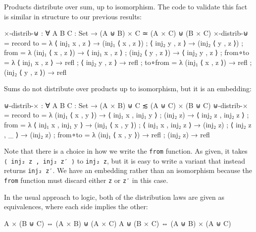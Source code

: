 Products distribute over sum, up to isomorphism. The code to validate
this fact is similar in structure to our previous results:

\begin{fence}
\begin{code}
×-distrib-⊎ : ∀ {A B C : Set} → (A ⊎ B) × C ≃ (A × C) ⊎ (B × C)
×-distrib-⊎ =
  record
    { to      = λ{ ⟨ inj₁ x , z ⟩ → (inj₁ ⟨ x , z ⟩)
                 ; ⟨ inj₂ y , z ⟩ → (inj₂ ⟨ y , z ⟩)
                 }
    ; from    = λ{ (inj₁ ⟨ x , z ⟩) → ⟨ inj₁ x , z ⟩
                 ; (inj₂ ⟨ y , z ⟩) → ⟨ inj₂ y , z ⟩
                 }
    ; from∘to = λ{ ⟨ inj₁ x , z ⟩ → refl
                 ; ⟨ inj₂ y , z ⟩ → refl
                 }
    ; to∘from = λ{ (inj₁ ⟨ x , z ⟩) → refl
                 ; (inj₂ ⟨ y , z ⟩) → refl
                 }
    }
\end{code}
\end{fence}

Sums do not distribute over products up to isomorphism, but it is an
embedding:

\begin{fence}
\begin{code}
⊎-distrib-× : ∀ {A B C : Set} → (A × B) ⊎ C ≲ (A ⊎ C) × (B ⊎ C)
⊎-distrib-× =
  record
    { to      = λ{ (inj₁ ⟨ x , y ⟩) → ⟨ inj₁ x , inj₁ y ⟩
                 ; (inj₂ z)         → ⟨ inj₂ z , inj₂ z ⟩
                 }
    ; from    = λ{ ⟨ inj₁ x , inj₁ y ⟩ → (inj₁ ⟨ x , y ⟩)
                 ; ⟨ inj₁ x , inj₂ z ⟩ → (inj₂ z)
                 ; ⟨ inj₂ z , _      ⟩ → (inj₂ z)
                 }
    ; from∘to = λ{ (inj₁ ⟨ x , y ⟩) → refl
                 ; (inj₂ z)         → refl
                 }
    }
\end{code}
\end{fence}

Note that there is a choice in how we write the \texttt{from} function.
As given, it takes \texttt{⟨\ inj₂\ z\ ,\ inj₂\ z′\ ⟩} to
\texttt{inj₂\ z}, but it is easy to write a variant that instead returns
\texttt{inj₂\ z′}. We have an embedding rather than an isomorphism
because the \texttt{from} function must discard either \texttt{z} or
\texttt{z′} in this case.

In the usual approach to logic, both of the distribution laws are given
as equivalences, where each side implies the other:

\begin{myDisplay}
A × (B ⊎ C) ⇔ (A × B) ⊎ (A × C)
A ⊎ (B × C) ⇔ (A ⊎ B) × (A ⊎ C)
\end{myDisplay}

